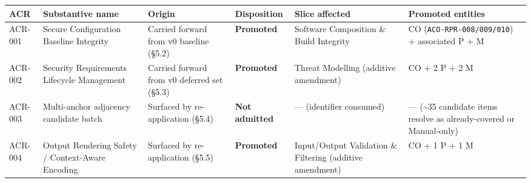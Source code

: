 \documentclass[
]{article}
\begin{document}
\begin{longtable}[]{@{}
  >{\raggedright\arraybackslash}p{}
  >{\raggedright\arraybackslash}p{}
  >{\raggedright\arraybackslash}p{}
  >{\raggedright\arraybackslash}p{}
  >{\raggedright\arraybackslash}p{}
  >{\raggedright\arraybackslash}p{}@{}}
\toprule\noalign{}
\begin{minipage}[b]{\linewidth}\raggedright
ACR
\end{minipage} & \begin{minipage}[b]{\linewidth}\raggedright
Substantive name
\end{minipage} & \begin{minipage}[b]{\linewidth}\raggedright
Origin
\end{minipage} & \begin{minipage}[b]{\linewidth}\raggedright
Disposition
\end{minipage} & \begin{minipage}[b]{\linewidth}\raggedright
Slice affected
\end{minipage} & \begin{minipage}[b]{\linewidth}\raggedright
Promoted entities
\end{minipage} \\
\midrule\noalign{}
\endhead
\bottomrule\noalign{}
\endlastfoot
ACR-001 & Secure Configuration Baseline Integrity & Carried forward from
v0 baseline (§5.2) & \textbf{Promoted} & Software Composition \& Build
Integrity & 3 CO (\texttt{ACO-RPR-008/009/010}) + associated P + M \\
ACR-002 & Security Requirements Lifecycle Management & Carried forward
from v0 deferred set (§5.3) & \textbf{Promoted} & Threat Modelling
(additive amendment) & 1 CO + 2 P + 2 M \\
ACR-003 & Multi-anchor adjacency candidate batch & Surfaced by
re-application (§5.4) & \textbf{Not admitted} & --- (identifier
consumed) & --- (\textasciitilde35 candidate items resolve as
already-covered or Manual-only) \\
ACR-004 & Output Rendering Safety / Context-Aware Encoding & Surfaced by
re-application (§5.5) & \textbf{Promoted} & Input/Output Validation \&
Filtering (additive amendment) & 1 CO + 1 P + 1 M \\
\end{longtable}
\end{document}

